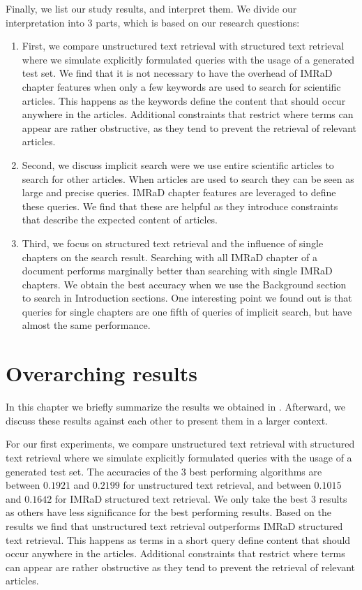 Finally, we list our study results, and interpret them. We divide our interpretation into $3$ parts, which is based on our research questions:
\begin{enumerate}[label=(\alph*)]
  \item First, we compare unstructured text retrieval with structured text retrieval where we simulate explicitly formulated queries with the usage of a generated test set. We find that it is not necessary to have the overhead of IMRaD chapter features when only a few keywords are used to search for scientific articles. This happens as the keywords define the content that should occur anywhere in the articles. Additional constraints that restrict where terms can appear are rather obstructive, as they tend to prevent the retrieval of relevant articles.
  \item Second, we discuss implicit search were we use entire scientific articles to search for other articles. When articles are used to search they can be seen as large and precise queries. IMRaD chapter features are leveraged to define these queries. We find that these are helpful as they introduce constraints that describe the expected content of articles.
  \item Third, we focus on structured text retrieval and the influence of single chapters on the search result. Searching with all IMRaD chapter of a document performs marginally better than searching with single IMRaD chapters. We obtain the best accuracy when we use the Background section to search in Introduction sections. One interesting point we found out is that queries for single chapters are one fifth of queries of implicit search, but have almost the same performance.
\end{enumerate}

\section{Overarching results}
\label{sec:overarching_results}

In this chapter we briefly summarize the results we obtained in . Afterward, we discuss these results against each other to present them in a larger context.

For our first experiments, we compare unstructured text retrieval with structured text retrieval where we simulate explicitly formulated queries with the usage of a generated test set. The accuracies of the $3$ best performing algorithms are between $0.1921$ and $0.2199$ for unstructured text retrieval, and between $0.1015$ and $0.1642$ for IMRaD structured text retrieval. We only take the best $3$ results as others have less significance for the best performing results. Based on the results we find that unstructured text retrieval outperforms IMRaD structured text retrieval. This happens as terms in a short query define content that should occur anywhere in the articles. Additional constraints that restrict where terms can appear are rather obstructive as they tend to prevent the retrieval of relevant articles.

